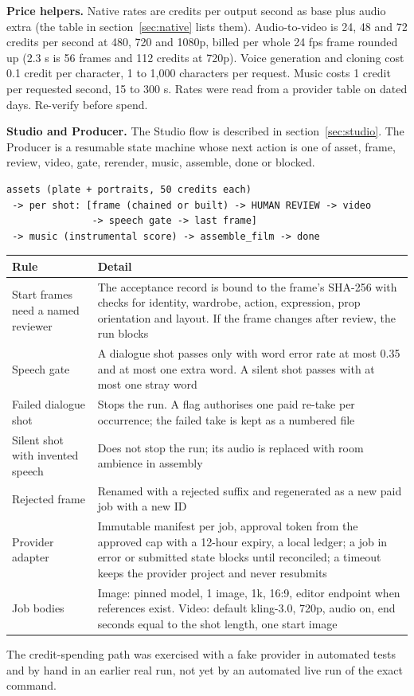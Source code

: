 \documentclass[11pt,a4paper]{article}
\begin{document}
\textbf{Price helpers.} Native rates are credits per output second as base plus audio extra (the table in section~\ref{sec:native} lists them). Audio-to-video is 24, 48 and 72 credits per second at 480, 720 and 1080p, billed per whole 24 fps frame rounded up (2.3 s is 56 frames and 112 credits at 720p). Voice generation and cloning cost 0.1 credit per character, 1 to 1,000 characters per request. Music costs 1 credit per requested second, 15 to 300 s. Rates were read from a provider table on dated days. Re-verify before spend.

\textbf{Studio and Producer.} The Studio flow is described in section~\ref{sec:studio}. The Producer is a resumable state machine whose next action is one of asset, frame, review, video, gate, rerender, music, assemble, done or blocked.
\begin{verbatim}
assets (plate + portraits, 50 credits each)
 -> per shot: [frame (chained or built) -> HUMAN REVIEW -> video
               -> speech gate -> last frame]
 -> music (instrumental score) -> assemble_film -> done
\end{verbatim}
\begin{longtable}{@{}P{3.8cm}P{11.7cm}@{}}
\toprule \textbf{Rule} & \textbf{Detail}\\ \midrule\endhead
Start frames need a named reviewer & The acceptance record is bound to the frame's SHA-256 with checks for identity, wardrobe, action, expression, prop orientation and layout. If the frame changes after review, the run blocks\\
Speech gate & A dialogue shot passes only with word error rate at most 0.35 and at most one extra word. A silent shot passes with at most one stray word\\
Failed dialogue shot & Stops the run. A flag authorises one paid re-take per occurrence; the failed take is kept as a numbered file\\
Silent shot with invented speech & Does not stop the run; its audio is replaced with room ambience in assembly\\
Rejected frame & Renamed with a rejected suffix and regenerated as a new paid job with a new ID\\
Provider adapter & Immutable manifest per job, approval token from the approved cap with a 12-hour expiry, a local ledger; a job in error or submitted state blocks until reconciled; a timeout keeps the provider project and never resubmits\\
Job bodies & Image: pinned model, 1 image, 1k, 16:9, editor endpoint when references exist. Video: default kling-3.0, 720p, audio on, end seconds equal to the shot length, one start image\\
\bottomrule
\end{longtable}
The credit-spending path was exercised with a fake provider in automated tests and by hand in an earlier real run, not yet by an automated live run of the exact command.
\end{document}
